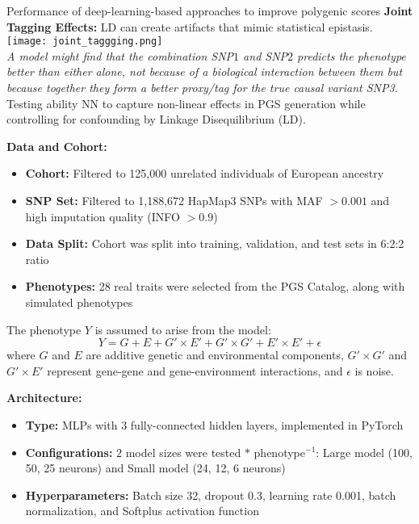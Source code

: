 \documentclass[twocolumn]{article}
\begin{document}
\begin{literaturepaper}{Performance of deep-learning-based approaches to improve polygenic scores \cite{Kelemen2025PolygenicScores}}
\textbf{Joint Tagging Effects:} LD can create artifacts that mimic statistical epistasis.\\

\texttt{[image: joint\_taggging.png]}\\

\textit{A model might find that the combination SNP$1$ and SNP$2$  predicts the phenotype better than either alone, not because of a biological interaction between them but because together they form a better proxy/tag for the true causal variant SNP3.}\\

Testing ability NN to capture non-linear effects in PGS generation while controlling for confounding by Linkage Disequilibrium (LD).

\textbf{Data and Cohort:}
\begin{itemize}
    \item \textbf{Cohort:} Filtered to 125,000 unrelated individuals of European ancestry
    \item \textbf{SNP Set:} Filtered to 1,188,672 HapMap3 SNPs with MAF $> 0.001$ and high imputation quality (INFO $> 0.9$)
    \item \textbf{Data Split:} Cohort was split into training, validation, and test sets in 6:2:2 ratio
    \item \textbf{Phenotypes:} 28 real traits were selected from the PGS Catalog, along with simulated phenotypes
\end{itemize}

The phenotype $Y$ is assumed to arise from the model:
\[
Y = G + E + G' \times E' + G' \times G' + E' \times E' + \epsilon
\]
where $G$ and $E$ are additive genetic and environmental components, $G' \times G'$ and $G' \times E'$ represent gene-gene and gene-environment interactions, and $\epsilon$ is noise.

\textbf{Architecture:}
\begin{itemize}
    \item \textbf{Type:} MLPs with $3$ fully-connected hidden layers, implemented in PyTorch
    \item \textbf{Configurations:} $2$ model sizes were tested $*$ phenotype$^{-1}$: Large model (100, 50, 25 neurons) and Small model (24, 12, 6 neurons)
    \item \textbf{Hyperparameters:} Batch size 32, dropout 0.3, learning rate 0.001, batch normalization, and Softplus activation function
\end{itemize}


\end{literaturepaper}
\end{document}
